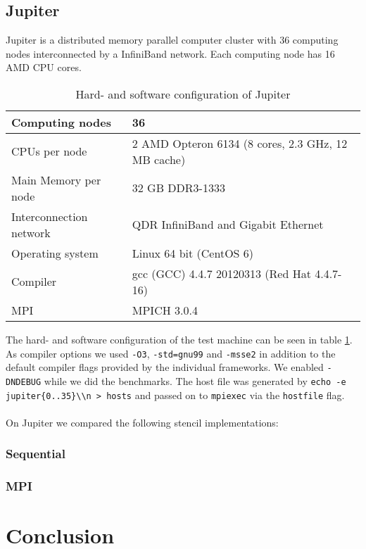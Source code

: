 \documentclass[11pt,a4paper]{article}
\begin{document}
\subsection{Jupiter}
Jupiter is a distributed memory parallel computer cluster with 36 computing nodes interconnected by a InfiniBand network. Each computing node has 16 AMD CPU cores.

\begin{table}[!ht]
  \label{tab:jupiter} 
  \caption{Hard- and software configuration of Jupiter}
  \begin{center}
    \begin{tabular}{|l|l|}
      \hline
      Computing nodes & 36\\\hline
      CPUs per node & 2 AMD Opteron 6134 (8 cores, 2.3 GHz, 12 MB cache)\\\hline
      Main Memory per node & 32 GB DDR3-1333\\\hline
      Interconnection network & QDR InfiniBand and Gigabit Ethernet\\\hline
      Operating system & Linux 64 bit (CentOS 6)\\\hline
      Compiler & gcc (GCC) 4.4.7 20120313 (Red Hat 4.4.7-16)\\\hline
      MPI & MPICH 3.0.4\\\hline
    \end{tabular}    
  \end{center}
\end{table}

The hard- and software configuration of the test machine can be seen in table \ref{tab:jupiter}. As compiler options we used \verb|-O3|, \verb|-std=gnu99| and \verb|-msse2| in addition to the default compiler flags provided by the individual frameworks. We enabled \verb|-DNDEBUG| while we did the benchmarks. The host file was generated by \verb|echo -e jupiter{0..35}\\n > hosts| and passed on to \verb|mpiexec| via the \verb|hostfile| flag.\\
\\
On Jupiter we compared the following stencil implementations:
\subsubsection{Sequential}
\subsubsection{MPI}

\section{Conclusion}
\end{document}
